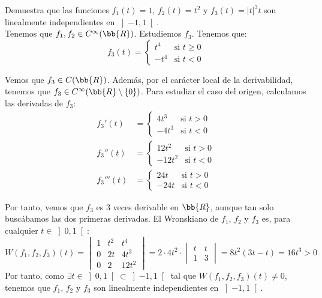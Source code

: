 \documentclass[12pt]{article}
\begin{document}
    \begin{ejercicio}
        Demuestra que las funciones $f_1(t) = 1$, $f_2(t) = t^2$ y $f_3(t) = |t|^3 t$ son linealmente independientes en $\left]-1, 1\right[$.\\

        Tenemos que $f_1,f_2\in C^\infty(\bb{R})$. Estudiemos $f_3$. Tenemos que:
        \begin{equation*}
            f_3(t) = \begin{cases}
                t^4 & \text{si } t\geq 0\\
                -t^4 & \text{si } t<0
            \end{cases}
        \end{equation*}

        Vemos que $f_3\in C(\bb{R})$. Además, por el carácter local de la derivabilidad, tenemos que $f_3\in C^\infty(\bb{R}\setminus\{0\})$. Para estudiar el caso del origen, calculamos las derivadas de $f_3$:
        \begin{align*}
            f_3'(t) &= \begin{cases}
                4t^3 & \text{si } t>0\\
                -4t^3 & \text{si } t<0
            \end{cases}\\
            f_3''(t) &= \begin{cases}
                12t^2 & \text{si } t>0\\
                -12t^2 & \text{si } t<0
            \end{cases}\\
            f_3'''(t) &= \begin{cases}
                24t & \text{si } t>0\\
                -24t & \text{si } t<0
            \end{cases}
        \end{align*}

        Por tanto, vemos que $f_3$ es $3$ veces derivable en $\bb{R}$, aunque tan solo buscábamos las dos primeras derivadas. El Wronskiano de $f_1$, $f_2$ y $f_3$ es, para cualquier $t\in \left]0,1\right[$:
        \begin{equation*}
            W(f_1,f_2,f_3)(t) = \begin{vmatrix}
                1 & t^2 & t^4\\
                0 & 2t & 4t^3\\
                0 & 2 & 12t^2
            \end{vmatrix} = 2\cdot 4t^2\cdot \begin{vmatrix}
                t & t\\
                1 & 3
            \end{vmatrix} = 8t^2(3t-t) = 16t^3>0
        \end{equation*}
        Por tanto, como $\exists t\in \left]0,1\right[\subset \left]-1,1\right[$ tal que $W(f_1,f_2,f_3)(t)\neq 0$, tenemos que $f_1$, $f_2$ y $f_3$ son linealmente independientes en $\left]-1,1\right[$.
    \end{ejercicio}
\end{document}
